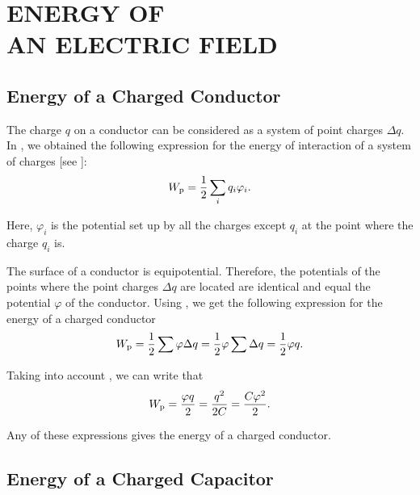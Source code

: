 

\chapter[ENERGY OF AN ELECTRIC FIELD]{ENERGY OF \\AN ELECTRIC FIELD}\label{chap:4}


\section{Energy of a Charged Conductor}\label{sec:4_1}

The charge $q$ on a conductor can be considered as a system of point charges $\Delta{q}$. In , we obtained the following expression for the energy of interaction of a system of charges [see ]:
\begin{equation}\label{eq:4_1}
	W_{\text{p}} = \frac{1}{2} \sum_i q_i \varphi_i.
\end{equation}

\noindent
Here, $\varphi_i$ is the potential set up by all the charges except $q_i$ at the point where the charge $q_i$ is.

The surface of a conductor is equipotential. Therefore, the potentials of the points where the point charges $\Delta{q}$ are located are identical and equal the potential $\varphi$ of the conductor. Using , we get the following expression for the energy of a charged conductor
\begin{equation}\label{eq:4_2}
	W_{\text{p}} = \frac{1}{2} \sum \varphi \Delta{q} = \frac{1}{2} \varphi \sum \Delta{q} = \frac{1}{2} \varphi q.
\end{equation}

\noindent
Taking into account , we can write that
\begin{equation}\label{eq:4_3}
	W_{\text{p}} = \frac{\varphi q}{2} = \frac{q^2}{2 C} = \frac{C \varphi^2}{2}.
\end{equation}

\noindent
Any of these expressions gives the energy of a charged conductor.

\section{Energy of a Charged Capacitor}\label{sec:4_2}

